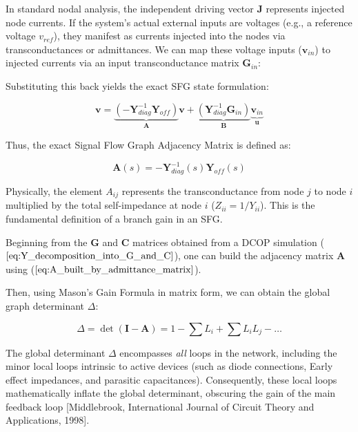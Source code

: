\documentclass[
]{article}
\begin{document}
In standard nodal analysis, the independent driving vector
\(\mathbf{J}\) represents injected node currents. If the system's actual
external inputs are voltages (e.g., a reference voltage \(v_{ref}\)),
they manifest as currents injected into the nodes via transconductances
or admittances. We can map these voltage inputs (\(\mathbf{v}_{in}\)) to
injected currents via an input transconductance matrix
\(\mathbf{G}_{in}\):

Substituting this back yields the exact SFG state formulation:

\begin{equation}
    \mathbf{v} = \underbrace{(-\mathbf{Y}_{diag}^{-1} \mathbf{Y}_{off})}_{\mathbf{A}} \mathbf{v} + \underbrace{(\mathbf{Y}_{diag}^{-1}\mathbf{G}_{in})}_{\mathbf{B}} \underbrace{\mathbf{v}_{in}}_{\mathbf{u}}
\end{equation}

Thus, the exact Signal Flow Graph Adjacency Matrix is defined as:

\begin{equation}
    \mathbf{A}(s) = -\mathbf{Y}_{diag}^{-1}(s) \mathbf{Y}_{off}(s)
    \label{eq:A_built_by_admittance_matrix}
\end{equation}

Physically, the element \(A_{ij}\) represents the transconductance from
node \(j\) to node \(i\) multiplied by the total self-impedance at node
\(i\) (\(Z_{ii} = 1/Y_{ii}\)). This is the fundamental definition of a
branch gain in an SFG.

Beginning from the \(\mathbf{G}\) and \(\mathbf{C}\) matrices obtained
from a DCOP simulation (\(\ref{eq:Y_decomposition_into_G_and_C}\)), one
can build the adjacency matrix \(\mathbf{A}\) using
(\(\ref{eq:A_built_by_admittance_matrix}\)).

Then, using Mason's Gain Formula in matrix form, we can obtain the
global graph determinant \(\Delta\):

\begin{equation}
    \Delta = \det(\mathbf{I} - \mathbf{A}) = 1 - \sum L_i + \sum L_i L_j - \dots
\end{equation}

The global determinant \(\Delta\) encompasses \emph{all} loops in the
network, including the minor local loops intrinsic to active devices
(such as diode connections, Early effect impedances, and parasitic
capacitances). Consequently, these local loops mathematically inflate
the global determinant, obscuring the gain of the main feedback loop
{[}Middlebrook, International Journal of Circuit Theory and
Applications, 1998{]}.
\end{document}

